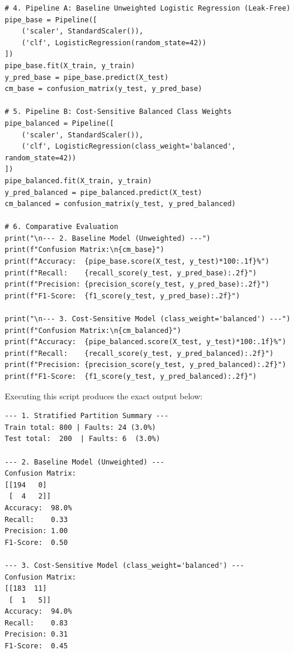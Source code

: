 \begin{lstlisting}[style=pythonstyle]
# 4. Pipeline A: Baseline Unweighted Logistic Regression (Leak-Free)
pipe_base = Pipeline([
    ('scaler', StandardScaler()),
    ('clf', LogisticRegression(random_state=42))
])
pipe_base.fit(X_train, y_train)
y_pred_base = pipe_base.predict(X_test)
cm_base = confusion_matrix(y_test, y_pred_base)

# 5. Pipeline B: Cost-Sensitive Balanced Class Weights
pipe_balanced = Pipeline([
    ('scaler', StandardScaler()),
    ('clf', LogisticRegression(class_weight='balanced', random_state=42))
])
pipe_balanced.fit(X_train, y_train)
y_pred_balanced = pipe_balanced.predict(X_test)
cm_balanced = confusion_matrix(y_test, y_pred_balanced)

# 6. Comparative Evaluation
print("\n--- 2. Baseline Model (Unweighted) ---")
print(f"Confusion Matrix:\n{cm_base}")
print(f"Accuracy:  {pipe_base.score(X_test, y_test)*100:.1f}%")
print(f"Recall:    {recall_score(y_test, y_pred_base):.2f}")
print(f"Precision: {precision_score(y_test, y_pred_base):.2f}")
print(f"F1-Score:  {f1_score(y_test, y_pred_base):.2f}")

print("\n--- 3. Cost-Sensitive Model (class_weight='balanced') ---")
print(f"Confusion Matrix:\n{cm_balanced}")
print(f"Accuracy:  {pipe_balanced.score(X_test, y_test)*100:.1f}%")
print(f"Recall:    {recall_score(y_test, y_pred_balanced):.2f}")
print(f"Precision: {precision_score(y_test, y_pred_balanced):.2f}")
print(f"F1-Score:  {f1_score(y_test, y_pred_balanced):.2f}")
\end{lstlisting}

Executing this script produces the exact output below:
\begin{lstlisting}[style=outputstyle]
--- 1. Stratified Partition Summary ---
Train total: 800 | Faults: 24 (3.0%)
Test total:  200  | Faults: 6  (3.0%)

--- 2. Baseline Model (Unweighted) ---
Confusion Matrix:
[[194   0]
 [  4   2]]
Accuracy:  98.0%
Recall:    0.33
Precision: 1.00
F1-Score:  0.50

--- 3. Cost-Sensitive Model (class_weight='balanced') ---
Confusion Matrix:
[[183  11]
 [  1   5]]
Accuracy:  94.0%
Recall:    0.83
Precision: 0.31
F1-Score:  0.45
\end{lstlisting}

